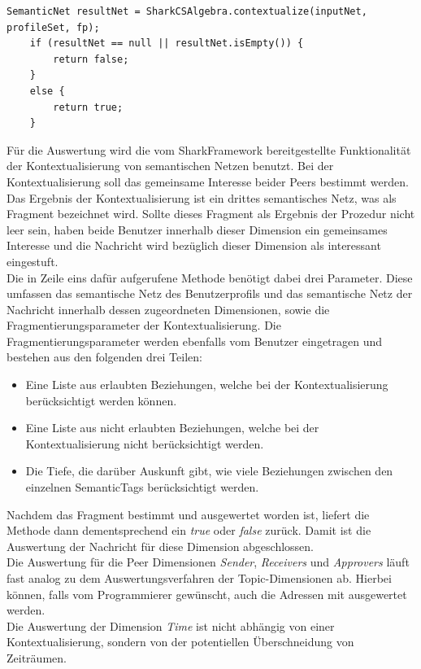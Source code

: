 \lstset{language=Java, caption=Auswertung des semantischen Netzes (Auszug), label=DescriptiveLabel, numbers=left, numbersep=1em, breaklines=true, basicstyle=\small}
\begin{lstlisting}
SemanticNet resultNet = SharkCSAlgebra.contextualize(inputNet, profileSet, fp);
	if (resultNet == null || resultNet.isEmpty()) {
		return false;
	}
	else {
		return true;
	}
\end{lstlisting}\newpage
Für die Auswertung wird die vom SharkFramework bereitgestellte Funktionalität der Kontextualisierung von semantischen Netzen benutzt. Bei der Kontextualisierung soll das gemeinsame Interesse beider Peers bestimmt werden. Das Ergebnis der Kontextualisierung ist ein drittes semantisches Netz, was als Fragment bezeichnet wird. Sollte dieses Fragment als Ergebnis der Prozedur nicht leer sein, haben beide Benutzer innerhalb dieser Dimension ein gemeinsames Interesse und die Nachricht wird bezüglich dieser Dimension als interessant eingestuft.
\\Die in Zeile eins dafür aufgerufene Methode benötigt dabei drei Parameter. Diese umfassen das semantische Netz des Benutzerprofils und das semantische Netz der Nachricht innerhalb dessen zugeordneten Dimensionen, sowie die Fragmentierungsparameter der Kontextualisierung. Die Fragmentierungsparameter werden ebenfalls vom Benutzer eingetragen und bestehen aus den folgenden drei Teilen:
\begin{itemize}
	\item Eine Liste aus erlaubten Beziehungen, welche bei der Kontextualisierung berücksichtigt werden können.
	\item Eine Liste aus nicht erlaubten Beziehungen, welche bei der Kontextualisierung nicht berücksichtigt werden.
	\item Die Tiefe, die darüber Auskunft gibt, wie viele Beziehungen zwischen den einzelnen SemanticTags berücksichtigt werden.
\end{itemize}
Nachdem das Fragment bestimmt und ausgewertet worden ist, liefert die Methode dann dementsprechend ein \textit{true} oder \textit{false} zurück. Damit ist die Auswertung der Nachricht für diese Dimension abgeschlossen.
\\Die Auswertung für die Peer Dimensionen \textit{Sender}, \textit{Receivers} und \textit{Approvers} läuft fast analog zu dem Auswertungsverfahren der Topic-Dimensionen ab. Hierbei können, falls vom Programmierer gewünscht, auch die Adressen mit ausgewertet werden. 
\\Die Auswertung der Dimension \textit{Time} ist nicht abhängig von einer Kontextualisierung, sondern von der potentiellen Überschneidung von Zeiträumen.\newpage
